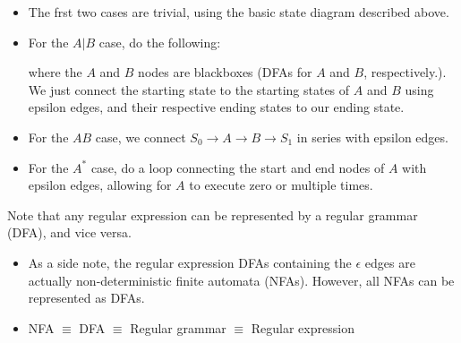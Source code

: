 \documentclass[10pt]{article}
\begin{document}
\begin{itemize}
    \item The frst two cases are trivial, using the basic state diagram described above.
    \item For the $A | B$ case, do the following:
    \begin{center}
    \end{center}
    where the $A$ and $B$ nodes are blackboxes (DFAs for $A$ and $B$, respectively.).  We just connect the starting state to the starting states of $A$ and $B$ using epsilon edges, and their respective ending states to our ending state.
    \item For the $AB$ case, we connect $S_0 \rightarrow A \rightarrow B \rightarrow S_1$ in series with epsilon edges.
    \newpage
    \item For the $A^*$ case, do a loop connecting the start and end nodes of $A$ with epsilon edges, allowing for $A$ to execute zero or multiple times.
    \begin{center}
    \end{center}
\end{itemize}
Note that any regular expression can be represented by a regular grammar (DFA), and vice versa.  
\begin{itemize}
    \item As a side note, the regular expression DFAs containing the $\epsilon$ edges are actually non-deterministic finite automata (NFAs).  However, all NFAs can be represented as DFAs.
    \item NFA $\equiv$ DFA $\equiv$ Regular grammar $\equiv$ Regular expression
\end{itemize}
\end{document}
